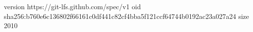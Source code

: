 version https://git-lfs.github.com/spec/v1
oid sha256:b760e6c136802f66161c0df441c82cf4bba5f121ccf64744b0192ac23a027a24
size 2010
